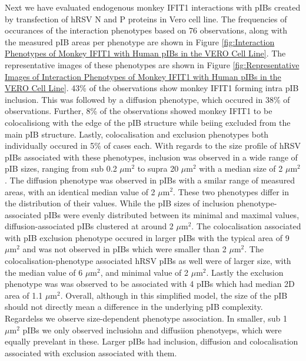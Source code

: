 Next we have evaluated endogenous monkey IFIT1 interactions with pIBs created by transfection of hRSV N and P proteins in Vero cell line. The frequencies of occurances of the interaction phenotypes based on 76 observations, along with the measured pIB areas per phenotype are shown in Figure \ref{fig:Interaction Phenotypes of Monkey IFIT1 with Human pIBs in the VERO Cell Line}. The representative images of these phenotypes are shown in Figure \ref{fig:Representative Images of Interaction Phenotypes of Monkey IFIT1 with Human pIBs in the VERO Cell Line}. 43\% of the observations show monkey IFIT1 forming intra pIB inclusion. This was followed by a diffusion phenotype, which occured in 38\% of observations. Further, 8\% of the observations showed monkey IFIT1 to be colocalisiong with the edge of the pIB structure while beiing excluded from the main pIB structure. Lastly, colocalisation and exclusion phenotypes both individually occured in 5\% of cases each. With regards to the size profile of hRSV pIBs associated with these phenotypes, inclusion was observed in a wide range of pIB sizes, ranging from sub 0.2 \(\mu \mbox{m}^2\) to supra 20 \(\mu \mbox{m}^2\) with a median size of 2 \(\mu \mbox{m}^2\). The diffusion phenotype was observed in pIBs with a smilar range of measured areas, with an identical median value of 2 \(\mu \mbox{m}^2\). These two phenotypes differ in the distribution of their values. While the pIB sizes of inclusion phenotype-associated pIBs were evenly distributed between its minimal and maximal values, diffusion-associated pIBs clustered at around 2 \(\mu \mbox{m}^2\). The colocalisation associated with pIB exclusion phenotype occured in larger pIBs with the typical area of 9 \(\mu \mbox{m}^2\) and was not observed in pIBs which were smaller than 2 \(\mu \mbox{m}^2\). The colocalisation-phenotype associated hRSV pIBs as well were of larger size, with the median value of 6 \(\mu \mbox{m}^2\), and minimal value of 2 \(\mu \mbox{m}^2\). Lastly the exclusion phenotype was was observed to be associated with 4 pIBs which had median 2D area of 1.1 \(\mu \mbox{m}^2\). Overall, although in this simplified model, the size of the pIB should not directly mean a difference in the underlying pIB complexity. Regardelss we observe size-dependent phenotype association. In smaller, sub 1 \(\mu \mbox{m}^2\) pIBs we only observed inclusiohn and diffusiion phenotyeps, which were equally prevelant in these. Larger pIBs had inclusion, diffusion and colocalisation associated with exclusion associated with them.

